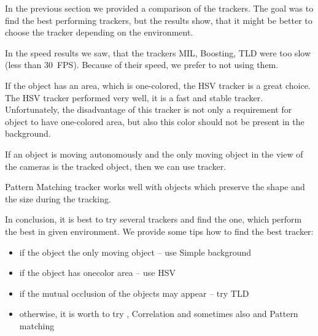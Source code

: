 In the previous section we provided a comparison of the trackers. The goal was
to find the best performing trackers, but the results show, that it might be
better to choose the tracker depending on the environment.

In the speed results we saw, that the trackers MIL, Boosting, TLD were too slow
(less than 30~FPS). Because of their speed, we prefer to not using them.

If the object has an area, which is one-colored, the HSV tracker is a great choice.
The HSV tracker performed very well, it is a fast and stable tracker.
Unfortunately, the disadvantage of this tracker is not only a requirement for
object to have one-colored area, but also this color should not be present in
the background.

If an object is moving autonomously and the only moving object in the view of
the cameras is the tracked object, then we can use \simback{} tracker.

Pattern Matching tracker works well with objects which preserve the shape
and the size during the tracking.

In conclusion, it is best to try several trackers and find the one, which
perform the best in given environment. We provide some tips how to find the
best tracker:
\begin{itemize}
\item if the object the only moving object -- use Simple background
\item if the object has onecolor area -- use HSV
\item if the mutual occlusion of the objects may appear -- try TLD
\item otherwise, it is worth to try \medflow{}, Correlation and sometimes also \mosse{} and Pattern matching
\end{itemize}


